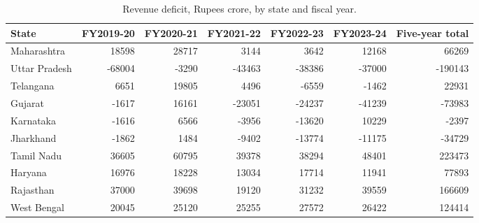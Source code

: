 \documentclass[12pt,a4paper]{article}
\begin{document}
\begin{table}[H]
\centering
\caption{Revenue deficit, Rupees crore, by state and fiscal year.}
\label{tab:9}
\footnotesize
\begin{adjustbox}{max width=\textwidth}
\begin{tabular}{@{}lrrrrrr@{}}
\toprule
State & FY2019-20 & FY2020-21 & FY2021-22 & FY2022-23 & FY2023-24 & Five-year total \\
\midrule
Maharashtra & 18598 & 28717 & 3144 & 3642 & 12168 & 66269 \\
Uttar Pradesh & -68004 & -3290 & -43463 & -38386 & -37000 & -190143 \\
Telangana & 6651 & 19805 & 4496 & -6559 & -1462 & 22931 \\
Gujarat & -1617 & 16161 & -23051 & -24237 & -41239 & -73983 \\
Karnataka & -1616 & 6566 & -3956 & -13620 & 10229 & -2397 \\
Jharkhand & -1862 & 1484 & -9402 & -13774 & -11175 & -34729 \\
Tamil Nadu & 36605 & 60795 & 39378 & 38294 & 48401 & 223473 \\
Haryana & 16976 & 18228 & 13034 & 17714 & 11941 & 77893 \\
Rajasthan & 37000 & 39698 & 19120 & 31232 & 39559 & 166609 \\
West Bengal & 20045 & 25120 & 25255 & 27572 & 26422 & 124414 \\
\bottomrule
\end{tabular}
\end{adjustbox}
\end{table}
\end{document}
